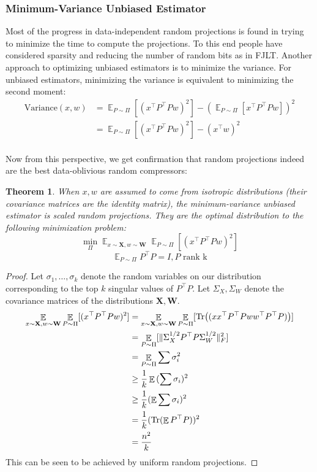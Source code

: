 \documentclass{article}
\newtheorem{theorem}{Theorem}[section]
\theoremstyle{definition}
\theoremstyle{plain}
\DeclareMathOperator{\E}{\mathbb{E}}
\DeclarePairedDelimiter\parentheses{\lparen}{\rparen}
\newcommand{\Tr}[1]{\operatorname{Tr} \parentheses*{#1}}
\begin{document}
\subsubsection*{Minimum-Variance Unbiased Estimator}
Most of the progress in data-independent random projections is found in trying to minimize the time to compute the projections. To this end people have considered sparsity and reducing the number of random bits as in FJLT. Another approach to optimizing unbiased estimators is to minimize the variance. For unbiased estimators, minimizing the variance is equivalent to minimizing the second moment:
\begin{align*}\text{Variance}(x,w) &= \E_{P \sim \Pi} [ (x^\top P^\top P w)^2 ] - (\E_{P \sim \Pi} [x^\top P^\top P w])^2 \\
&=\E_{P \sim \Pi} [ (x^\top P^\top P w)^2 ] - (x^\top w)^2 \\
\end{align*}

Now from this perspective, we get confirmation that random projections indeed are the best data-oblivious random compressors:
\begin{theorem}
When $x,w$ are assumed to come from isotropic distributions (their covariance matrices are the identity matrix), the minimum-variance unbiased estimator is scaled random projections. They are the optimal distribution to the following minimization problem:
\[ \min_{\Pi} \E_{x \sim \mathbf{X}, w \sim \mathbf{W}} \E_{P \sim \Pi}[(x^\top P^\top P w)^2] \]
\[ \E_{P \sim \Pi} P^\top P = I, P \text{ rank k} \]
\end{theorem}
\begin{proof}
Let $\sigma_1, \ldots, \sigma_k$ denote the random variables on our distribution corresponding to the top $k$ singular values of $P^\top P$. Let $\Sigma_X, \Sigma_W$ denote the covariance matrices of the distributions $\mathbf{X}, \mathbf{W}$.
\begin{align*}
    \E_{x \sim \mathbf{X}, w \sim \mathbf{W}} \E_{P \sim \Pi}[(x^\top P^\top P w)^2] &= \E_{x \sim \mathbf{X}, w \sim \mathbf{W}} \E_{P \sim \Pi}[\Tr{(xx^\top P^\top P w w^\top P^\top P )}] \\
    &= \E_{P \sim \Pi}[\| \Sigma_X^{1/2} P^\top P \Sigma_W^{1/2}\|_F^2] \\
    &= \E_{P \sim \Pi}{\sum \sigma_i^2} \\
    &\geq\frac{1}{k} \E{(\sum \sigma_i)^2} \\
    &\geq \frac{1}{k} (\E \sum \sigma_i)^2 \\
    &= \frac{1}{k} (\text{Tr}( \E P^\top P))^2 \\
    &= \frac{n^2}{k} \\
\end{align*}
This can be seen to be achieved by uniform random projections.
\end{proof}
\end{document}
